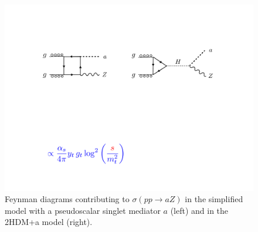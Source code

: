 \begin{figure}
\centering
\includegraphics[width=.8\textwidth]{figures/diagrams}
\caption{\label{fig:diagrams} Feynman diagrams contributing to $\sigma(pp \to a Z)$ in the simplified model with a pseudoscalar singlet mediator $a$ (left) and in the 2HDM+a model (right). }
\end{figure}
		

